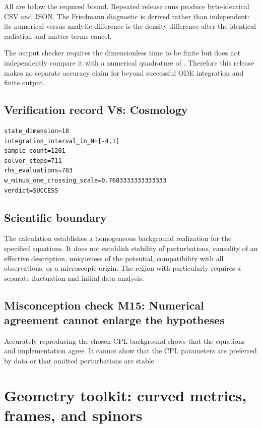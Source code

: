 \documentclass[11pt]{article}
\begin{document}
All are below the required \texttt{} bound. Repeated release runs produce byte-identical CSV and JSON. The Friedmann diagnostic is derived rather than independent: its numerical-versus-analytic difference is the density difference after the identical radiation and matter terms cancel.

The output checker requires the dimensionless time \texttt{} to be finite but does not independently compare it with a numerical quadrature of \texttt{}. Therefore this release makes no separate accuracy claim for \texttt{} beyond successful ODE integration and finite output.

\subsection{Verification record V8: Cosmology}

\begin{Verbatim}[fontsize=\small]
state_dimension=18
integration_interval_in_N=[-4,1]
sample_count=1201
solver_steps=711
rhs_evaluations=783
w_minus_one_crossing_scale=0.7683333333333333
verdict=SUCCESS
\end{Verbatim}

\subsection{Scientific boundary}

The calculation establishes a homogeneous background realization for the specified equations. It does not establish stability of perturbations, causality of an effective description, uniqueness of the potential, compatibility with all observations, or a microscopic origin. The region with \texttt{} particularly requires a separate fluctuation and initial-data analysis.

\subsection{Misconception check M15: Numerical agreement cannot enlarge the hypotheses}

Accurately reproducing the chosen CPL background shows that the equations and implementation agree. It cannot show that the CPL parameters are preferred by data or that omitted perturbations are stable.

\section{Geometry toolkit: curved metrics, frames, and spinors}
\end{document}
